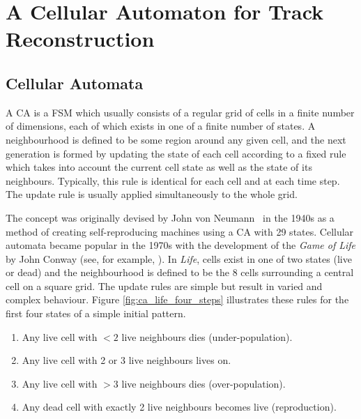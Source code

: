 \chapter{A Cellular Automaton for Track Reconstruction}\label{chapter:CellularAutomaton}

\section{Cellular Automata}
A \acf{CA} is a \ac{FSM} which usually consists of a regular grid of cells in a finite number of dimensions, each of which exists in one of a finite number of states. A neighbourhood is defined to be some region around any given cell, and the next generation is formed by updating the state of each cell according to a fixed rule which takes into account the current cell state as well as the state of its neighbours. Typically, this rule is identical for each cell and at each time step. The update rule is usually applied simultaneously to the whole grid.

The concept was originally devised by John von Neumann~\citep{vonNeumann1966} in the 1940s as a method of creating self-reproducing machines using a \ac{CA} with 29 states. Cellular automata became popular in the 1970s with the development of the \emph{Game of Life} by John Conway (see, for example, \citep{Gardner1970}). In \emph{Life}, cells exist in one of two states (live or dead) and the neighbourhood is defined to be the 8 cells surrounding a central cell on a square grid. The update rules are simple but result in varied and complex behaviour. Figure \ref{fig:ca_life_four_steps} illustrates these rules for the first four states of a simple initial pattern.

\begin{enumerate}
\item Any live cell with $< 2$ live neighbours dies (under-population).
\item Any live cell with 2 or 3 live neighbours lives on.
\item Any live cell with $> 3$ live neighbours dies (over-population).
\item Any dead cell with exactly 2 live neighbours becomes live (reproduction).
\end{enumerate}

